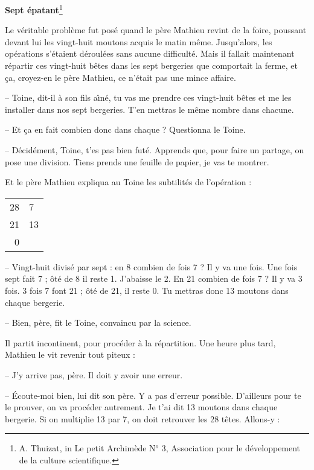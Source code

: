 {
{\Large \bf Sept \'epatant}\footnote{A. Thuizat, in {\sc Le petit Archim\`ede} N$^{o}$ 3, Association
pour le d\'eveloppement de la culture scientifique.}

\noindent\hrulefill

Le v\'eritable probl\`eme fut pos\'e quand le p\`ere Mathieu revint de la foire,
poussant devant lui les vingt-huit moutons acquis le matin m\^eme. Jusqu'alors,
les op\'erations s'\'etaient d\'eroul\'ees sans aucune difficult\'e.  Mais il fallait
maintenant r\'epartir ces vingt-huit b\^etes dans les sept bergeries que
comportait la ferme, et \c ca, croyez-en le p\`ere Mathieu, ce n'\'etait pas une
mince affaire.

-- Toine, dit-il \`a son fils a\^\i n\'e,
tu vas me prendre ces vingt-huit b\^etes et me les
installer dans nos sept bergeries. T'en mettras le m\^eme nombre dans chacune.

-- Et \c ca en fait combien donc dans chaque ? Questionna le Toine.

-- D\'ecid\'ement, Toine, t'es pas bien fut\'e. Apprends que, pour faire un partage,
on pose une division. Tiens prends une feuille de papier, je vas te montrer.

Et le p\`ere Mathieu expliqua au Toine les subtilit\'es de l'op\'eration :

\begin{floatingtable}[r]{{\begin{tabular}{r|l}
{\large  28} & {\large 7} \\
\cline{2-2}
{\large 21} & {\large 13} \\
{\large 0}  & \\
\end{tabular}}}\end{floatingtable}

      -- Vingt-huit divis\'e par sept : en 8 combien de fois 7 ? Il
	  y va une fois. Une fois sept fait 7 ; \^ot\'e de 8 il reste 1.
	  J'abaisse le 2. En 21 combien de fois 7 ? Il y va 3 fois. 3
	  fois 7 font 21 ; \^ot\'e de 21, il reste 0. Tu mettras donc 13
	  moutons dans chaque bergerie.

-- Bien, p\`ere, fit le Toine, convaincu par la science.

Il partit incontinent, pour proc\'eder \`a la r\'epartition.
Une heure plus tard,
Mathieu le vit revenir tout piteux :

-- J'y arrive pas, p\`ere. Il doit y avoir une erreur.

-- \'Ecoute-moi bien, lui dit son p\`ere. Y a pas d'erreur possible. D'ailleurs
pour te le prouver, on va proc\'eder autrement. Je t'ai dit 13 moutons dans
chaque bergerie. Si on multiplie 13 par 7, on doit retrouver les 28 t\^etes.
Allons-y :

}
